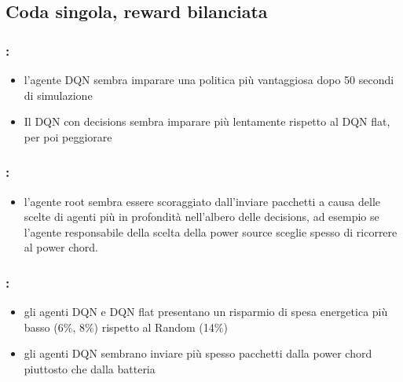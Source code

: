 \documentclass[compress]{beamer}
\begin{document}
\subsection{Coda singola, reward bilanciata}

\begin{frame}
    \frametitle{\secname: \subsecname}
    \begin{figure}
        \centering
        
        \label{fig:cumulative_reward_dqnDeep_dqnFlat_random_defaultConfig}
    \end{figure}
    \begin{itemize}
        \item l'agente DQN sembra imparare una politica più vantaggiosa dopo
         50 secondi di simulazione
        \item Il DQN con decisions sembra
        imparare più lentamente rispetto al DQN flat, per poi peggiorare
    \end{itemize}
\end{frame}
\begin{frame}
    \frametitle{\secname: \subsecname}
    \begin{figure}
        \centering
        
        \label{fig:sendCount_allAgents_defaultConfig}
    \end{figure}
    \begin{itemize}
        \item l'agente root sembra essere scoraggiato dall'inviare pacchetti a causa delle scelte di agenti
        più in profondità nell'albero delle decisions, ad esempio se l'agente responsabile della
        scelta della power source sceglie spesso di ricorrere al power chord.
    \end{itemize}
\end{frame}
\begin{frame}
    \frametitle{\secname: \subsecname}
    \begin{figure}
        \centering
        
        \label{fig:energySaving_defaultConfig_allAgents}
        \end{figure}
    \only<+> {\begin{itemize}
        \item gli agenti DQN e DQN flat presentano un risparmio di spesa energetica più basso (6\%, 8\%) rispetto al Random (14\%)
        \item gli agenti DQN sembrano inviare più spesso pacchetti dalla power chord piuttosto che dalla batteria
    \end{itemize}}
\end{frame}
\end{document}
